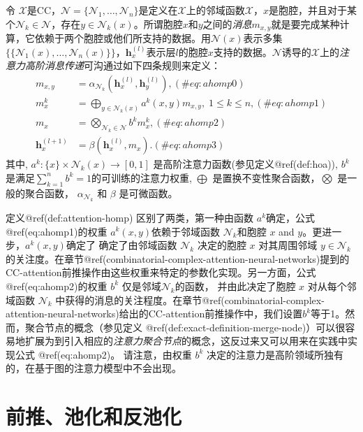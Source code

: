 \documentclass[
  12pt,
]{krantz}
\begin{document}
\label{attention-homp}
令
\(\mathcal{X}\)是CC，\(\mathcal{N}=\{ \mathcal{N}_1,\ldots,\mathcal{N}_n\}\)是定义在\(\mathcal{X}\)上的邻域函数\(\mathcal{X}\)，\(x\)是胞腔，并且对于某个\(\mathcal{N}_k \in \mathcal{N}\)，存在\(y\in \mathcal{N}_k(x)\)。所谓胞腔\(x\)和\(y\)之间的\emph{消息}\(m_{x,y}\)就是要完成某种计算，它依赖于两个胞腔或他们所支持的数据。用\(\mathcal{N}(x)\)表示多集
\(\{\!\!\{ \mathcal{N}_1(x) , \ldots ,  \mathcal{N}_n (x) \}\!\!\}\)，\(\mathbf{h}_x^{(l)}\)表示层\(l\)的胞腔\(x\)支持的数据。\(\mathcal{N}\)诱导的\(\mathcal{X}\)上的\emph{注意力高阶消息传递}可沟通过如下四条规则来定义：
\begin{align}
m_{x,y} &= \alpha_{\mathcal{N}_k}(\mathbf{h}_x^{(l)},\mathbf{h}_y^{(l)}), (\#eq:ahomp0) \\
m_{x}^k &=  \bigoplus_{y \in \mathcal{N}_k(x)} a^k(x,y)  m_{x,y}, \; 1\leq k \leq n , (\#eq:ahomp1) \\
m_{x} &=  \bigotimes_{ \mathcal{N}_k \in \mathcal{N} } b^k m_x^k , (\#eq:ahomp2) \\
\mathbf{h}_x^{(l+1)} &= \beta (\mathbf{h}_x^{(l)}, m_x) . (\#eq:ahomp3)
\end{align} 其中, \(a^k \colon \{x\} \times \mathcal{N}_k(x)\to [0,1]\)
是高阶注意力函数(参见定义@ref(def:hoa)), \(b^k\)
是满足\(\sum_{k=1}^n b^k=1\)的可训练的注意力权重, \(\bigoplus\)
是置换不变性聚合函数，\(\bigotimes\) 是一般的聚合函数，
\(\alpha_{\mathcal{N}_k}\) 和 \(\beta\) 是可微函数。

定义@ref(def:attention-homp) 区别了两类，第一种由函数
\(a^k\)确定，公式@ref(eq:ahomp1)的权重 \(a^k(x,y)\)依赖于邻域函数
\(\mathcal{N}_k\)和胞腔 \(x\) and \(y\)。更进一步，\(a^k(x,y)\)确定了
确定了由邻域函数 \(\mathcal{N}_k\) 决定的胞腔 \(x\) 对其周围邻域
\(y\in\mathcal{N}_k\)
的关注度。在章节@ref(combinatorial-complex-attention-neural-networks)提到的CC-attention前推操作由这些权重来特定的参数化实现。另一方面，公式@ref(eq:ahomp2)的权重
\(b^k\) 仅是邻域\(\mathcal{N}_k\)的函数， 并由此决定了胞腔 \(x\)
对从每个邻域函数 \(\mathcal{N}_k\)
中获得的消息的关注程度。在章节@ref(combinatorial-complex-attention-neural-networks)给出的CC-attention前推操作中，我们设置\(b^k\)等于1。然而，聚合节点的概念（参见定义
@ref(def:exact-definition-merge-node)）可以很容易地扩展为到引入相应的\emph{注意力聚合节点}的概念，这反过来又可以用来在实践中实现公式
@ref(eq:ahomp2)。 请注意，由权重 \(b^k\)
决定的注意力是高阶领域所独有的，在基于图的注意力模型中不会出现。

\section{前推、池化和反池化}\label{push-forward-pooling-and-unpooling}
\end{document}
